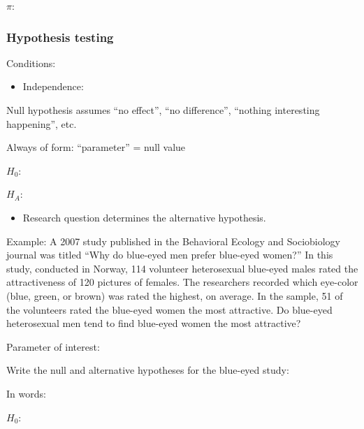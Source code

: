 \documentclass[
]{report}
\providecommand{\tightlist}{%
  \setlength{\itemsep}{0pt}\setlength{\parskip}{0pt}}
\newcommand{\rgi}{\hspace{24pt}}  %
\begin{document}
\(\pi:\)

\vspace{0.5in}

\hypertarget{hypothesis-testing-1}{%
\subsubsection*{Hypothesis testing}\label{hypothesis-testing-1}}

Conditions:

\begin{itemize}
\tightlist
\item
  Independence:
\end{itemize}

\vspace{0.3in}

Null hypothesis assumes ``no effect'', ``no difference'', ``nothing interesting happening'', etc.

\rgi Always of form: ``parameter'' = null value

\(H_0:\)

\vspace{0.5in}

\(H_A:\)

\vspace{0.5in}

\begin{itemize}
\tightlist
\item
  Research question determines the alternative hypothesis.
\end{itemize}

Example: A 2007 study published in the Behavioral Ecology and Sociobiology journal was titled ``Why do blue-eyed men prefer blue-eyed women?'' In this study, conducted in Norway, 114 volunteer heterosexual blue-eyed males rated the attractiveness of 120 pictures of females. The researchers recorded which eye-color (blue, green, or brown) was rated the highest, on average. In the sample, 51 of the volunteers rated the blue-eyed women the most attractive. Do blue-eyed heterosexual men tend to find blue-eyed women the most attractive?

Parameter of interest:

\vspace{0.6in}

Write the null and alternative hypotheses for the blue-eyed study:

In words:

\(H_0:\)
\end{document}

